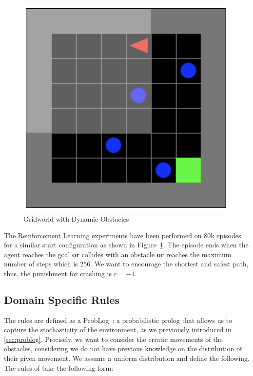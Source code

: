 \begin{multicols}{2}[\medskip]
    \begin{figure}[H]
      \centering
      \includegraphics[scale=0.55]{figures/gridworldrl.png}
      \caption{Gridworld with Dynamic Obstacles}
      \label{fig:gridrl}
    \end{figure}
    \columnbreak
    The Reinforcement Learning experiments have been performed on 80k 
    episodes for a similar start configuration as shown in Figure~\ref{fig:gridrl}. The episode ends when the agent 
    reaches the goal \textbf{or} collides with an obstacle \textbf{or} reaches the maximum number of steps which is $256$. We want to encourage the shortest and safest path, thus, the punishment for crashing is $r = -1$. 
\end{multicols}

\subsection{Domain Specific Rules}
The rules are defined as a ProbLog~\cite{problog}: a probabilistic prolog that allows us to capture 
the stochasticity of the environment, as we previously introduced in \ref{sec:problog}. Precisely, we want to consider the erratic movements of the obstacles, considering 
we do not have previous knowledge on the distribution of their given movement. We assume a uniform distribution and define the following. 
The rules of \dio{} take the following form: 

